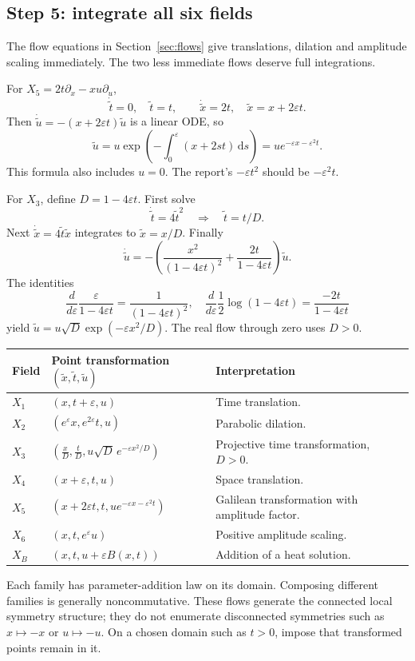 \documentclass[11pt,a4paper]{article}
\numberwithin{equation}{section}
\theoremstyle{definition}
\theoremstyle{plain}
\theoremstyle{remark}
\newcommand{\dd}{\,\mathrm d}
\begin{document}
\subsection{Step 5: integrate all six fields}\label{sec:heat-finite}
The flow equations in Section~\ref{sec:flows} give translations, dilation and amplitude scaling immediately. The two less immediate flows deserve full integrations.

For $X_5=2t\partial_x-xu\partial_u$,
\[
\dot{\widetilde t}=0,\quad\widetilde t=t,\qquad
\dot{\widetilde x}=2t,\quad\widetilde x=x+2\varepsilon t.
\]
Then $\dot{\widetilde u}=-(x+2\varepsilon t)\widetilde u$ is a linear ODE, so
\[
\widetilde u=u\exp\left(-\int_0^\varepsilon(x+2st)\dd s\right)
=u e^{-\varepsilon x-\varepsilon^2t}.
\]
This formula also includes $u=0$. The report's $-\varepsilon t^2$ should be $-\varepsilon^2t$.

For $X_3$, define $D=1-4\varepsilon t$. First solve
\[
\dot{\widetilde t}=4\widetilde t^2\quad\Longrightarrow\quad
\widetilde t=t/D.
\]
Next $\dot{\widetilde x}=4\widetilde t\widetilde x$ integrates to $\widetilde x=x/D$. Finally
\[
\dot{\widetilde u}=-\left(\frac{x^2}{(1-4\varepsilon t)^2}+\frac{2t}{1-4\varepsilon t}\right)\widetilde u.
\]
The identities
\[
\frac{d}{d\varepsilon}\frac{\varepsilon}{1-4\varepsilon t}=\frac1{(1-4\varepsilon t)^2},
\quad
\frac{d}{d\varepsilon}\frac12\log(1-4\varepsilon t)=\frac{-2t}{1-4\varepsilon t}
\]
yield $\widetilde u=u\sqrt D\exp(-\varepsilon x^2/D)$. The real flow through zero uses $D>0$.

\begin{center}\renewcommand{\arraystretch}{1.55}
\begin{tabularx}{\linewidth}{@{}p{.11\linewidth}Y >{\raggedright\arraybackslash}p{.24\linewidth}@{}}
\toprule Field & Point transformation $(\widetilde x,\widetilde t,\widetilde u)$ & Interpretation \\
\midrule
$X_1$ & $(x,t+\varepsilon,u)$ & Time translation.\\
$X_2$ & $(e^\varepsilon x,e^{2\varepsilon}t,u)$ & Parabolic dilation.\\
$X_3$ & $\displaystyle\left(\frac{x}{D},\frac{t}{D},u\sqrt D\,e^{-\varepsilon x^2/D}\right)$ & Projective time transformation, $D>0$.\\
$X_4$ & $(x+\varepsilon,t,u)$ & Space translation.\\
$X_5$ & $(x+2\varepsilon t,t,u e^{-\varepsilon x-\varepsilon^2t})$ & Galilean transformation with amplitude factor.\\
$X_6$ & $(x,t,e^\varepsilon u)$ & Positive amplitude scaling.\\
$X_B$ & $(x,t,u+\varepsilon B(x,t))$ & Addition of a heat solution.\\
\bottomrule
\end{tabularx}
\end{center}
Each family has parameter-addition law on its domain. Composing different families is generally noncommutative. These flows generate the connected local symmetry structure; they do not enumerate disconnected symmetries such as $x\mapsto-x$ or $u\mapsto-u$. On a chosen domain such as $t>0$, impose that transformed points remain in it.
\end{document}
